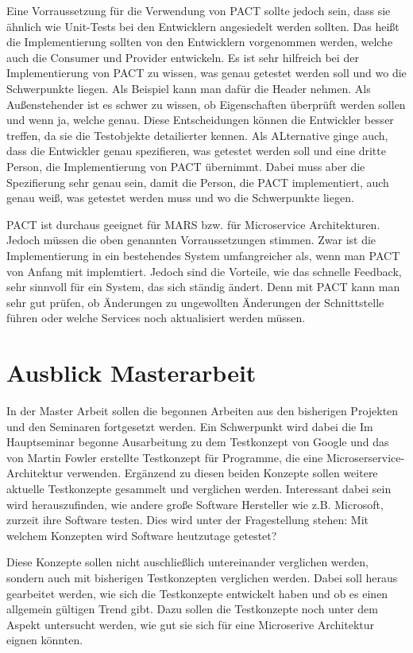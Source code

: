 \documentclass{llncs}
\begin{document}
Eine Vorraussetzung für die Verwendung von PACT sollte jedoch sein, dass sie ähnlich wie Unit-Tests bei den Entwicklern angesiedelt werden sollten. Das heißt die Implementierung sollten von den Entwicklern vorgenommen werden, welche auch die Consumer und Provider entwickeln. Es ist sehr hilfreich bei der Implementierung von PACT zu wissen, was genau getestet werden soll und wo die Schwerpunkte liegen. Als Beispiel kann man dafür die Header nehmen. Als Außenstehender ist es schwer zu wissen, ob Eigenschaften überprüft werden sollen und wenn ja, welche genau. Diese Entscheidungen können die Entwickler besser treffen, da sie die Testobjekte detailierter kennen. Als ALternative ginge auch, dass die Entwickler genau spezifieren, was getestet werden soll und eine dritte Person, die Implementierung von PACT übernimmt. Dabei muss aber die Spezifierung sehr genau sein, damit die Person, die PACT implementiert, auch genau weiß, was getestet werden muss und wo die Schwerpunkte liegen. 

PACT ist durchaus geeignet für MARS bzw. für Microservice Architekturen. Jedoch müssen die oben genannten Vorraussetzungen stimmen. Zwar ist die Implementierung in ein bestehendes System umfangreicher als, wenn man PACT von Anfang mit implemtiert. Jedoch sind die Vorteile, wie das schnelle Feedback, sehr sinnvoll für ein System, das sich ständig ändert. Denn mit PACT kann man sehr gut prüfen, ob Änderungen zu ungewollten Änderungen der Schnittstelle führen oder welche Services noch aktualisiert werden müssen.

\section{Ausblick Masterarbeit}
In der Master Arbeit sollen die begonnen Arbeiten aus den bisherigen Projekten und den Seminaren fortgesetzt werden. Ein Schwerpunkt wird dabei die Im Hauptseminar begonne Ausarbeitung zu dem Testkonzept von Google und das von Martin Fowler erstellte Testkonzept für Programme, die eine Microserservice-Architektur verwenden. Ergänzend zu diesen beiden Konzepte sollen weitere aktuelle Testkonzepte gesammelt und verglichen werden. Interessant dabei sein wird herauszufinden, wie andere große Software Hersteller wie z.B. Microsoft, zurzeit ihre Software testen. Dies wird unter der Fragestellung stehen: Mit welchem Konzepten wird Software heutzutage getestet?

Diese Konzepte sollen nicht auschließlich untereinander verglichen werden, sondern auch mit bisherigen Testkonzepten verglichen werden. Dabei soll heraus gearbeitet werden, wie sich die Testkonzepte entwickelt haben und ob es einen allgemein gültigen Trend gibt. Dazu sollen die Testkonzepte noch unter dem Aspekt untersucht werden, wie gut sie sich für eine Microserive Architektur eignen könnten.
\end{document}
